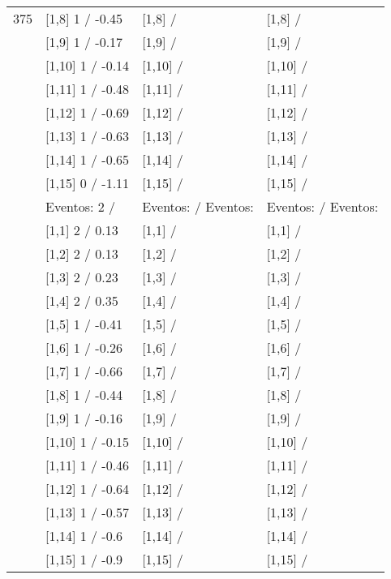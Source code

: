 \begin{table}
\begin{tabular}[t]{llll}
375 & {}[1,8] 1  / -0.45 & {}[1,8]  / & {}[1,8]  /\\
\addlinespace
 & {}[1,9] 1  / -0.17 & {}[1,9]  / & {}[1,9]  /\\
 & {}[1,10] 1  / -0.14 & {}[1,10]  / & {}[1,10]  /\\
 & {}[1,11] 1  / -0.48 & {}[1,11]  / & {}[1,11]  /\\
 & {}[1,12] 1  / -0.69 & {}[1,12]  / & {}[1,12]  /\\
 & {}[1,13] 1  / -0.63 & {}[1,13]  / & {}[1,13]  /\\
\addlinespace
 & {}[1,14] 1  / -0.65 & {}[1,14]  / & {}[1,14]  /\\
 & {}[1,15] 0  / -1.11 & {}[1,15]  / & {}[1,15]  /\\
 & Eventos:  2 / & Eventos:   / Eventos: & Eventos:   / Eventos:\\
 & {}[1,1] 2  / 0.13 & {}[1,1]  / & {}[1,1]  /\\
 & {}[1,2] 2  / 0.13 & {}[1,2]  / & {}[1,2]  /\\
\addlinespace
 & {}[1,3] 2  / 0.23 & {}[1,3]  / & {}[1,3]  /\\
 & {}[1,4] 2  / 0.35 & {}[1,4]  / & {}[1,4]  /\\
 & {}[1,5] 1  / -0.41 & {}[1,5]  / & {}[1,5]  /\\
 & {}[1,6] 1  / -0.26 & {}[1,6]  / & {}[1,6]  /\\
 & {}[1,7] 1  / -0.66 & {}[1,7]  / & {}[1,7]  /\\
\addlinespace
500 & {}[1,8] 1  / -0.44 & {}[1,8]  / & {}[1,8]  /\\
 & {}[1,9] 1  / -0.16 & {}[1,9]  / & {}[1,9]  /\\
 & {}[1,10] 1  / -0.15 & {}[1,10]  / & {}[1,10]  /\\
 & {}[1,11] 1  / -0.46 & {}[1,11]  / & {}[1,11]  /\\
 & {}[1,12] 1  / -0.64 & {}[1,12]  / & {}[1,12]  /\\
\addlinespace
 & {}[1,13] 1  / -0.57 & {}[1,13]  / & {}[1,13]  /\\
 & {}[1,14] 1  / -0.6 & {}[1,14]  / & {}[1,14]  /\\
 & {}[1,15] 1  / -0.9 & {}[1,15]  / & {}[1,15]  /\\
\bottomrule
\end{tabular}
\end{table}
